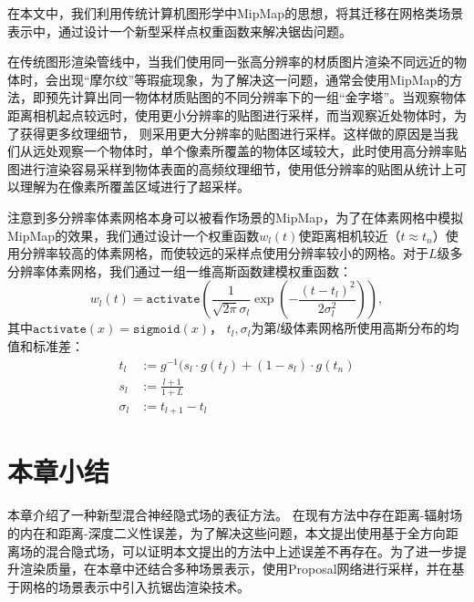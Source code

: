 在本文中，我们利用传统计算机图形学中MipMap\cite{williams_pyramidal_1983}的思想，将其迁移在网格类场景表示中，通过设计一个新型采样点权重函数来解决锯齿问题。

在传统图形渲染管线中，当我们使用同一张高分辨率的材质图片渲染不同远近的物体时，会出现“摩尔纹”等瑕疵现象，为了解决这一问题，通常会使用MipMap的方法，即预先计算出同一物体材质贴图的不同分辨率下的一组“金字塔”。当观察物体距离相机起点较远时，使用更小分辨率的贴图进行采样，而当观察近处物体时，为了获得更多纹理细节， 则采用更大分辨率的贴图进行采样。这样做的原因是当我们从远处观察一个物体时，单个像素所覆盖的物体区域较大，此时使用高分辨率贴图进行渲染容易采样到物体表面的高频纹理细节，使用低分辨率的贴图从统计上可以理解为在像素所覆盖区域进行了超采样。

注意到多分辨率体素网格本身可以被看作场景的MipMap，为了在体素网格中模拟MipMap的效果，我们通过设计一个权重函数$w_l(t)$使距离相机较近（$t\approx t_n$）使用分辨率较高的体素网格，而使较远的采样点使用分辨率较小的网格。对于$L$级多分辨率体素网格，我们通过一组一维高斯函数建模权重函数：
\begin{equation}
    w_l(t) = \mathtt{activate}(\frac{1}{\sqrt{2\pi}\sigma_l}\exp(-\frac{(t-t_l)^2}{2\sigma_l^2})),
\end{equation}
其中$\mathtt{activate}(x) = \mathtt{sigmoid}(x)$， $t_l, \sigma_l$为第$l$级体素网格所使用高斯分布的均值和标准差：
\begin{align}
    t_l &:= g^{-1}(s_l\cdot g(t_f) + (1-s_l)\cdot g(t_n)\\
    s_l &:= \frac{l + 1}{1 + L}\\
    \sigma_l &:= t_{l+1} - t_{l}
\end{align}


\section{本章小结}
本章介绍了一种新型混合神经隐式场的表征方法。 在现有方法中存在距离-辐射场的内在和距离-深度二义性误差，为了解决这些问题，本文提出使用基于全方向距离场的混合隐式场，可以证明本文提出的方法中上述误差不再存在。为了进一步提升渲染质量，在本章中还结合多种场景表示，使用Proposal网络进行采样，并在基于网格的场景表示中引入抗锯齿渲染技术。